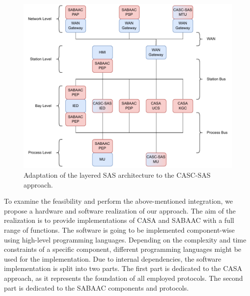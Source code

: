 \begin{figure}
    \centering
    \includegraphics[width=1.0\linewidth]{figures/casc_architecture_color.drawio.pdf}
    \caption{Adaptation of the layered SAS architecture to the CASC-SAS approach.
    }
    \label{fig:casc_architecture}
\end{figure}

To examine the feasibility and perform the above-mentioned integration, we propose a hardware and software realization of our approach.
The aim of the realization is to provide implementations of CASA and SABAAC with a full range of functions.
The software is going to be implemented component-wise using high-level programming languages.
Depending on the complexity and time constraints of a specific component, different programming languages might be used for the implementation.
Due to internal dependencies, the software implementation is split into two parts.
The first part is dedicated to the CASA approach, as it represents the foundation of all employed protocols.
The second part is dedicated to the SABAAC components and protocols.

